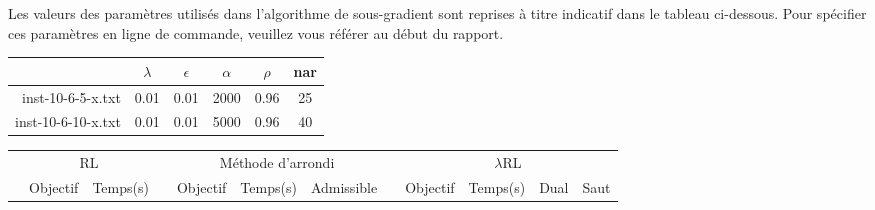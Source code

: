 Les valeurs des paramètres utilisés dans l'algorithme de sous-gradient sont reprises à titre indicatif dans le tableau ci-dessous. Pour spécifier ces paramètres en ligne de commande, veuillez vous référer au début du rapport.
\begin{center}
\begin{tabular}{r|c|c|c|c|c|}
	& $\lambda$ & $\epsilon$ & $\alpha$ & $\rho$ & nar\\
	\hline \hline
	inst-10-6-5-x.txt & 0.01 & 0.01 & 2000 & 0.96 & 25 \\
	inst-10-6-10-x.txt & 0.01 & 0.01 & 5000 & 0.96 & 40 \\
	\hline	
\end{tabular}
\end{center}\newpage
\begin{landscape}

\begin{table}[h!]\centering
{}
\begin{tabular}{@{}rrrcrrrcrrrr@{}}\toprule
& \multicolumn{2}{c}{RL} & \phantom{abc} & \multicolumn{3}{c}{Méthode d'arrondi} & \phantom{abc} & \multicolumn{4}{c}{$\lambda$RL}\\
\cmidrule{2-3} \cmidrule{5-7} \cmidrule{9-12}
& Objectif & Temps(s) & & Objectif & Temps(s) & Admissible & & Objectif & Temps(s) & Dual & Saut\\ \midrule


\end{tabular}
\end{table}
\end{landscape}
